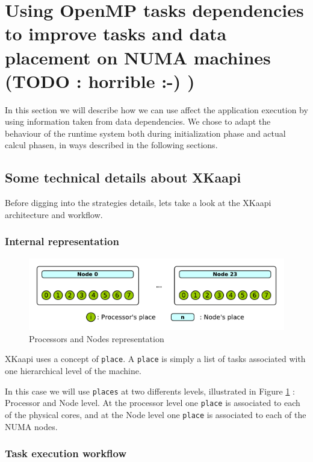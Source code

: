 \documentclass{Styles/llncs}
\begin{document}
\section{Using OpenMP tasks dependencies to improve tasks and data
  placement on NUMA machines (TODO : horrible :-) )}

In this section we will describe how we can use affect the application execution
by using information taken from data dependencies.
We chose to adapt the behaviour of the runtime system both during initialization
phase and actual calcul phasen, in ways described in the following sections.


\subsection{Some technical details about XKaapi}

Before digging into the strategies details, lets take a look at the XKaapi
architecture and workflow.

\subsubsection{Internal representation}

\begin{figure}[t]
  \centering
  \includegraphics[scale=0.8]{./figures/topology.pdf}
\caption{Processors and Nodes representation}
\label{fig:detail-topology}
\end{figure}

XKaapi uses a concept of \verb/place/.
A \verb/place/ is simply a list of tasks associated with one hierarchical level
of the machine.

In this case we will use \verb/places/ at two differents levels, illustrated in
Figure \ref{fig:detail-topology} : Processor and Node level.
At the processor level one \verb/place/ is associated to each of the physical cores, and
at the Node level one \verb/place/ is associated to each of the NUMA nodes.


\subsubsection{Task execution workflow}
\end{document}

